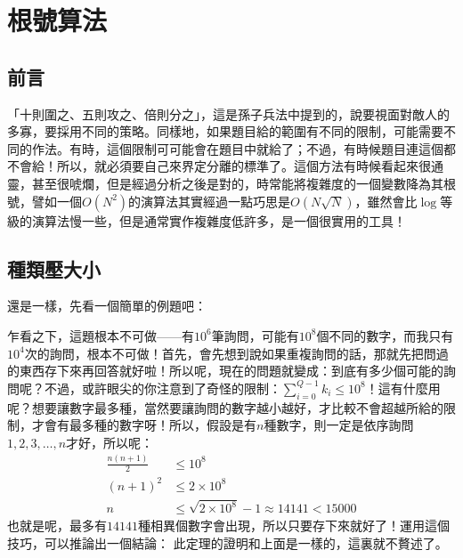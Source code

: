 \chapter{根號算法}
\section{前言}
	「十則圍之、五則攻之、倍則分之」，這是孫子兵法中提到的，說要視面對敵人的多寡，要採用不同的策略。同樣地，如果題目給的範圍有不同的限制，可能需要不同的作法。有時，這個限制可可能會在題目中就給了；不過，有時候題目連這個都不會給！所以，就必須要自己來界定分離的標準了。這個方法有時候看起來很通靈，甚至很唬爛，但是經過分析之後是對的，時常能將複雜度的一個變數降為其根號，譬如一個$O(N^2)$的演算法其實經過一點巧思是$O(N\sqrt{N})$，雖然會比$\log$等級的演算法慢一些，但是通常實作複雜度低許多，是一個很實用的工具！

\section{種類壓大小}
	還是一樣，先看一個簡單的例題吧：

	乍看之下，這題根本不可做——有$10^6$筆詢問，可能有$10^8$個不同的數字，而我只有$10^4$次的詢問，根本不可做！首先，會先想到說如果重複詢問的話，那就先把問過的東西存下來再回答就好啦！所以呢，現在的問題就變成：到底有多少個可能的詢問呢？不過，或許眼尖的你注意到了奇怪的限制：$\sum^{Q - 1}_{i = 0} k_i \leq 10^8$！這有什麼用呢？想要讓數字最多種，當然要讓詢問的數字越小越好，才比較不會超越所給的限制，才會有最多種的數字呀！所以，假設是有$n$種數字，則一定是依序詢問$1, 2, 3, \dots, n$才好，所以呢：
	\begin{align*}
		\frac{n(n + 1)}{2} &\leq 10^8\\	
		(n + 1)^2 &\leq 2 \times 10^8\\
		n &\leq \sqrt{2 \times 10^8} - 1 \approx 14141 < 15000
	\end{align*}
	也就是呢，最多有$14141$種相異個數字會出現，所以只要存下來就好了！運用這個技巧，可以推論出一個結論：
	此定理的證明和上面是一樣的，這裏就不贅述了。


